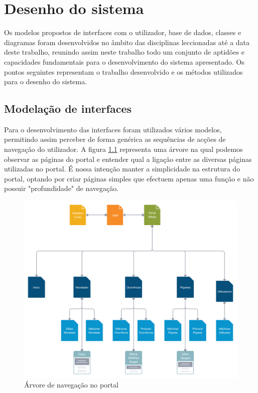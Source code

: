 \chapter{Desenho do sistema}
\label{cap3}

Os modelos propostos de interfaces com o utilizador, base de dados, classes e diagramas foram desenvolvidos no âmbito das disciplinas leccionadas até a data deste trabalho, reunindo assim neste trabalho todo um conjunto de aptidões e capacidades fundamentais para o desenvolvimento do sistema apresentado. Os pontos seguintes representam o trabalho desenvolvido e os métodos utilizados para o desenho do sistema.

\section{Modelação de interfaces}

Para o desenvolvimento das interfaces foram utilizados vários modelos, permitindo assim perceber de forma genérica as sequências de acções de navegação do utilizador. A figura \ref{fig:diagrama_arvore} representa uma árvore na qual podemos observar as páginas do portal e entender qual a ligação entre as diversas páginas utilizadas no portal.
É nossa intenção manter a simplicidade na estrutura do portal, optando por criar páginas simples que efectuem apenas uma função e não possuir "profundidade" de navegação.

\begin{figure}[!h]
	\centering
	\includegraphics[width=\textwidth]{figuras/diagrama_arvore.png}
	\caption{Árvore de navegação no portal}
	\label{fig:diagrama_arvore}
\end{figure}

